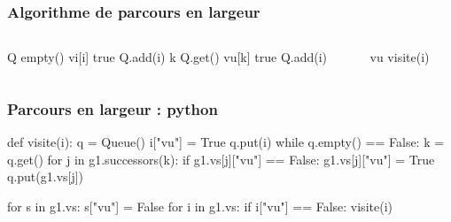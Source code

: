     \begin{frame}[fragile]
        \frametitle{Algorithme de parcours en largeur}
            \begin{columns}
                \begin{column}{.55\textwidth}
                    \begin{algorithmic}
                        \State Q \gets empty() 
                        \State vi[i] \gets true 
                        \State Q.add(i) 
                            \State k \gets Q.get()
                                \State vu[k] \gets true 
                                \State Q.add(i)
                                \EndIf
                            \EndFor
                        \EndWhile
                        \EndFunction
                    \end{algorithmic}
                \end{column}
                \begin{column}{.45\textwidth}
                    \begin{algorithmic}
                        \State vu 
                                \State visite(i)
                            \EndIf
                        \EndFor
                    \end{algorithmic}            
                \end{column}
            \end{columns}    
        \end{frame}
    
\begin{frame}[fragile]
\frametitle{Parcours en largeur : python}
    \begin{pythoncode}
def visite(i):
    q = Queue()
    i["vu"] = True
    q.put(i)
    while q.empty() == False:
        k = q.get()
        for j in g1.successors(k):
            if g1.vs[j]["vu"] == False:
                g1.vs[j]["vu"] = True
                q.put(g1.vs[j])

for s in g1.vs:
    s["vu"] = False
for i in g1.vs:
    if i["vu"] == False:
        visite(i)        
    \end{pythoncode}
\end{frame}